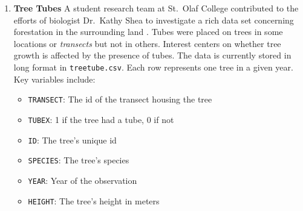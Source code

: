 \documentclass[
]{krantz}
\providecommand{\tightlist}{%
  \setlength{\itemsep}{0pt}\setlength{\parskip}{0pt}}
\begin{document}
\begin{enumerate}
\def\labelenumi{\arabic{enumi}.}
\tightlist
\item
  \textbf{Tree Tubes} A student research team at St.~Olaf College contributed to the efforts of biologist Dr.~Kathy Shea to investigate a rich data set concerning forestation in the surrounding land \citep{Eisinger2011}. Tubes were placed on trees in some locations or \emph{transects} but not in others. Interest centers on whether tree growth is affected by the presence of tubes. The data is currently stored in long format in \texttt{treetube.csv}. Each row represents one tree in a given year. Key variables include:

  \begin{itemize}
  \tightlist
  \item
    \texttt{TRANSECT}: The id of the transect housing the tree
  \item
    \texttt{TUBEX}: 1 if the tree had a tube, 0 if not
  \item
    \texttt{ID}: The tree's unique id
  \item
    \texttt{SPECIES}: The tree's species
  \item
    \texttt{YEAR}: Year of the observation
  \item
    \texttt{HEIGHT}: The tree's height in meters
  \end{itemize}


\end{enumerate}
\end{document}
